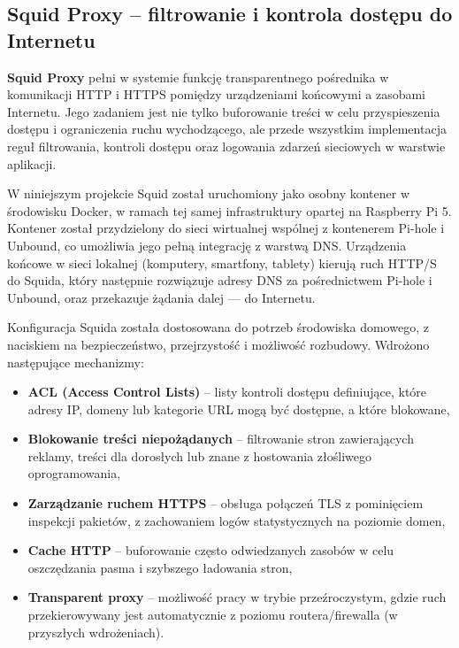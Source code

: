 \documentclass[
    left=2.5cm,         %
    right=2.5cm,        %
    top=2.5cm,          %
    bottom=3cm,         %
    bindingoffset=6mm,  %
    nohyphenation=true %
]{eiti/eiti-thesis} %
\begin{document}
\subsection{Squid Proxy – filtrowanie i kontrola dostępu do Internetu}

\textbf{Squid Proxy}\cite{squid-docs} pełni w systemie funkcję transparentnego pośrednika w komunikacji HTTP i HTTPS pomiędzy urządzeniami końcowymi a zasobami Internetu. Jego zadaniem jest nie tylko buforowanie treści w celu przyspieszenia dostępu i ograniczenia ruchu wychodzącego, ale przede wszystkim implementacja reguł filtrowania, kontroli dostępu oraz logowania zdarzeń sieciowych w warstwie aplikacji.

W niniejszym projekcie Squid został uruchomiony jako osobny kontener w środowisku Docker, w ramach tej samej infrastruktury opartej na Raspberry Pi 5. Kontener został przydzielony do sieci wirtualnej wspólnej z kontenerem Pi-hole i Unbound, co umożliwia jego pełną integrację z warstwą DNS\cite{config-squid}. Urządzenia końcowe w sieci lokalnej (komputery, smartfony, tablety) kierują ruch HTTP/S do Squida, który następnie rozwiązuje adresy DNS za pośrednictwem Pi-hole i Unbound, oraz przekazuje żądania dalej — do Internetu.

Konfiguracja Squida została dostosowana do potrzeb środowiska domowego, z naciskiem na bezpieczeństwo, przejrzystość i możliwość rozbudowy. Wdrożono następujące mechanizmy:
\begin{itemize}
    \item \textbf{ACL (Access Control Lists)} – listy kontroli dostępu definiujące, które adresy IP, domeny lub kategorie URL mogą być dostępne, a które blokowane,
    \item \textbf{Blokowanie treści niepożądanych} – filtrowanie stron zawierających reklamy, treści dla dorosłych lub znane z hostowania złośliwego oprogramowania,
    \item \textbf{Zarządzanie ruchem HTTPS} – obsługa połączeń TLS z pominięciem inspekcji pakietów, z zachowaniem logów statystycznych na poziomie domen,
    \item \textbf{Cache HTTP} – buforowanie często odwiedzanych zasobów w celu oszczędzania pasma i szybszego ładowania stron,
    \item \textbf{Transparent proxy} – możliwość pracy w trybie przeźroczystym, gdzie ruch przekierowywany jest automatycznie z poziomu routera/firewalla (w przyszłych wdrożeniach).
\end{itemize}
\end{document}
